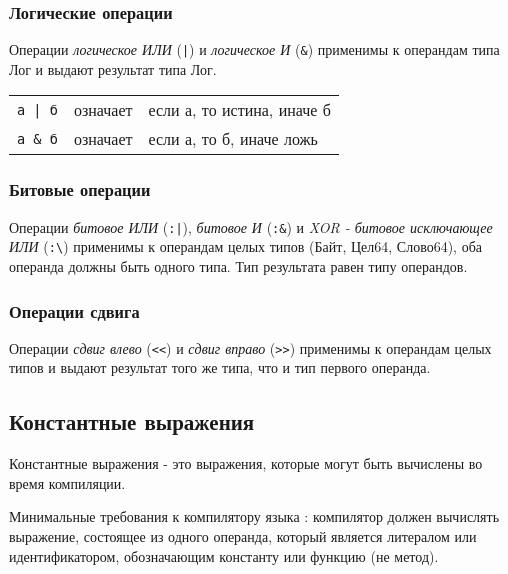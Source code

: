 \hypertarget{ops-logical}{%
\subsubsection{Логические операции}\label{expr:ops-logical}}

Операции \emph{логическое ИЛИ} (\verb+|+) и \emph{логическое И} (\verb+&+) применимы к операндам типа Лог и выдают результат типа Лог.

\smallskip
\begin{tabular}[c]{rcl}
\verb+а | б+  & означает & если а, то истина, иначе б \\
\verb+а & б+  & означает & если а, то б,  иначе ложь \\
\end{tabular}

\hypertarget{ops-bitwise}{%
\subsubsection{Битовые операции}\label{expr:ops-bitwise}}

Операции \emph{битовое ИЛИ} (\verb+:|+), \emph{битовое И} (\verb+:&+) и \emph{XOR - битовое исключающее ИЛИ} (\verb+:\+) 
применимы к операндам целых типов (Байт, Цел64, Слово64), оба операнда должны быть одного типа. 
Тип результата равен типу операндов.

\hypertarget{ops-shifts}{%
\subsubsection{Операции сдвига}\label{expr:ops-shifts}}

Операции \emph{сдвиг влево} (\verb+<<+) и \emph{сдвиг вправо} (\verb+>>+) применимы к операндам целых типов
и выдают результат того же типа, что и тип первого операнда.


\hypertarget{const-expr}{%
\subsection{Константные выражения}\label{expr:const-expr}}

Константные выражения - это выражения, которые могут быть вычислены во время компиляции.

Минимальные требования к компилятору языка \thelang{}: компилятор должен вычислять выражение, состоящее из одного операнда, который является литералом или 
идентификатором, обозначающим константу или функцию (не метод).




